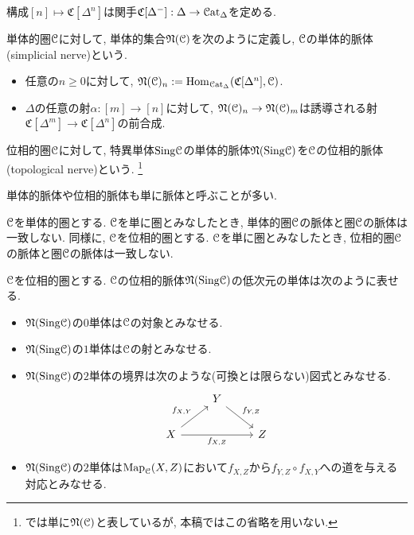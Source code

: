 \documentclass[uplatex, a4paper, 14Q, dvipdfmx]{jsreport}
\begin{document}
\begin{remark} \label{rem.1.1.5.4}
  構成$[n] \mapsto \mathfrak{C}[\Delta^n]$は関手$\mathfrak{C}[\Delta^-] : \Delta \to \mathcal{C}\mathrm{at}_\Delta$を定める. 
\end{remark}

\begin{definition} \label{def.1.1.5.5}
  単体的圏$\mathcal{C}$に対して, 単体的集合$\mathfrak{N}(\mathcal{C})$を次のように定義し, $\mathcal{C}$の単体的脈体(simplicial nerve)という. 
  \begin{itemize}
    \item 任意の$n \geq 0$に対して, $\mathfrak{N}(\mathcal{C})_n := \mathrm{Hom}_{\mathcal{C}\mathrm{at}_\Delta}(\mathfrak{C}[\Delta^n],\mathcal{C})$.
    \item $\Delta$の任意の射$\alpha : [m] \to [n]$に対して, $\mathfrak{N}(\mathcal{C})_n \to \mathfrak{N}(\mathcal{C})_m$は誘導される射$\mathfrak{C}[\Delta^m] \to \mathfrak{C}[\Delta^n]$の前合成. 
  \end{itemize}
  位相的圏$\mathcal{C}$に対して, 特異単体$\mathrm{Sing}\mathcal{C}$の単体的脈体$\mathfrak{N}(\mathrm{Sing}\mathcal{C})$を$\mathcal{C}$の位相的脈体(topological nerve)という. 
  \footnote{
    \cite{HTT}では単に$\mathfrak{N}(\mathcal{C})$と表しているが, 本稿ではこの省略を用いない.
  }
\end{definition}

\begin{remark} \label{rem.1.1.5.6}
  単体的脈体や位相的脈体も単に脈体と呼ぶことが多い. 
\end{remark}

\begin{remark} \label{warn.1.1.5.7}
  $\mathcal{C}$を単体的圏とする. 
  $\mathcal{C}$を単に圏とみなしたとき, 単体的圏$\mathcal{C}$の脈体と圏$\mathcal{C}$の脈体は一致しない. 
  同様に, $\mathcal{C}$を位相的圏とする. 
  $\mathcal{C}$を単に圏とみなしたとき, 位相的圏$\mathcal{C}$の脈体と圏$\mathcal{C}$の脈体は一致しない. 
\end{remark}

\begin{example} \label{eg.1.1.5.8}
  $\mathcal{C}$を位相的圏とする.
  $\mathcal{C}$の位相的脈体$\mathfrak{N}(\mathrm{Sing}\mathcal{C})$の低次元の単体は次のように表せる. 
  \begin{itemize}
    \item $\mathfrak{N}(\mathrm{Sing}\mathcal{C})$の$0$単体は$\mathcal{C}$の対象とみなせる. 
    \item $\mathfrak{N}(\mathrm{Sing}\mathcal{C})$の$1$単体は$\mathcal{C}$の射とみなせる.
    \item $\mathfrak{N}(\mathrm{Sing}\mathcal{C})$の$2$単体の境界は次のような(可換とは限らない)図式とみなせる. 
    \[\begin{tikzcd}
      & Y \\
      X && Z
      \arrow["{f_{X,Z}}"', from=2-1, to=2-3]
      \arrow["{f_{X,Y}}", from=2-1, to=1-2]
      \arrow["{f_{Y,Z}}", from=1-2, to=2-3]
    \end{tikzcd}\]
    \item $\mathfrak{N}(\mathrm{Sing}\mathcal{C})$の$2$単体は$\mathrm{Map}_{\mathcal{C}}(X,Z)$において$f_{X,Z}$から$f_{Y,Z} \circ f_{X,Y}$への道を与える対応とみなせる. 
  \end{itemize}
\end{example}
\end{document}
